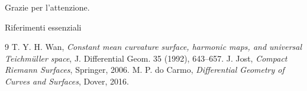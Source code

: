 \documentclass[aspectratio=169,11pt]{beamer}
\begin{document}
\begin{frame}
  \vfill
  \begin{center}
    \Huge Grazie per l'attenzione.
  \end{center}
  \vfill
\end{frame}
\begin{frame}[allowframebreaks]{Riferimenti essenziali}
\footnotesize
\begin{thebibliography}{9}
 T. Y. H. Wan, \emph{Constant mean curvature surface, harmonic maps, and universal Teichmüller space}, J. Differential Geom. 35 (1992), 643--657.
 J. Jost, \emph{Compact Riemann Surfaces}, Springer, 2006.
 M. P. do Carmo, \emph{Differential Geometry of Curves and Surfaces}, Dover, 2016.
\end{thebibliography}
\end{frame}
\end{document}
